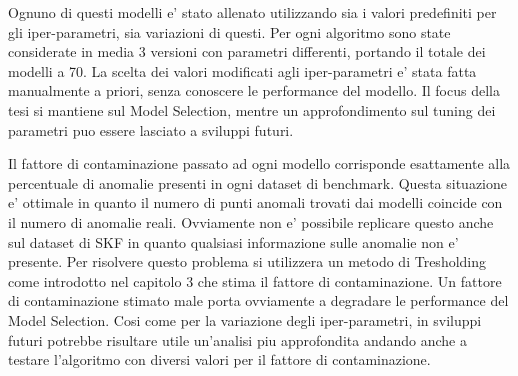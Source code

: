 Ognuno di questi modelli e' stato allenato utilizzando sia i valori predefiniti per gli iper-parametri, sia variazioni di questi. 
Per ogni algoritmo sono state considerate in media 3 versioni con parametri differenti, portando il totale dei modelli a 70.
La scelta dei valori modificati agli iper-parametri e' stata fatta manualmente a priori, senza conoscere le performance del modello. Il focus della tesi si mantiene sul Model Selection, mentre un approfondimento sul tuning dei parametri puo essere lasciato a sviluppi futuri.

Il fattore di contaminazione passato ad ogni modello corrisponde esattamente alla percentuale di anomalie presenti in ogni dataset di benchmark. Questa situazione e' ottimale in quanto il numero di punti anomali trovati dai modelli coincide con il numero di anomalie reali. Ovviamente non e' possibile replicare questo anche sul dataset di SKF in quanto qualsiasi informazione sulle anomalie non e' presente. Per risolvere questo problema si utilizzera un metodo di Tresholding come introdotto nel capitolo 3 che stima il fattore di contaminazione. Un fattore di contaminazione stimato male porta ovviamente a degradare le performance del Model Selection. Cosi come per la variazione degli iper-parametri, in sviluppi futuri potrebbe risultare utile un'analisi piu approfondita andando anche a testare l'algoritmo con diversi valori per il fattore di contaminazione.


